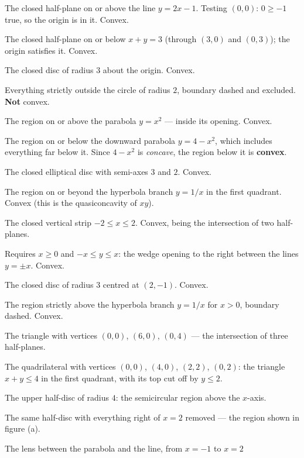 \begin{solutions}
  \item The closed half-plane on or above the line $y=2x-1$. Testing
        $(0,0)$: $0\ge-1$ true, so the origin is in it. Convex.
  \item The closed half-plane on or below $x+y=3$ (through $(3,0)$ and
        $(0,3)$); the origin satisfies it. Convex.
  \item The closed disc of radius $3$ about the origin. Convex.
  \item Everything strictly outside the circle of radius $2$, boundary
        dashed and excluded. \textbf{Not} convex.
  \item The region on or above the parabola $y=x^{2}$ --- inside its
        opening. Convex.
  \item The region on or below the downward parabola $y=4-x^{2}$, which
        includes everything far below it. Since $4-x^{2}$ is
        \emph{concave}, the region below it is \textbf{convex}.
  \item The closed elliptical disc with semi-axes $3$ and $2$. Convex.
  \item The region on or beyond the hyperbola branch $y=1/x$ in the first
        quadrant. Convex (this is the quasiconcavity of $xy$).
  \item The closed vertical strip $-2\le x\le2$. Convex, being the
        intersection of two half-planes.
  \item Requires $x\ge0$ and $-x\le y\le x$: the wedge opening to the right
        between the lines $y=\pm x$. Convex.
  \item The closed disc of radius $3$ centred at $(2,-1)$. Convex.
  \item The region strictly above the hyperbola branch $y=1/x$ for $x>0$,
        boundary dashed. Convex.
  \item The triangle with vertices $(0,0)$, $(6,0)$, $(0,4)$ --- the
        intersection of three half-planes.
  \item The quadrilateral with vertices $(0,0)$, $(4,0)$, $(2,2)$,
        $(0,2)$: the triangle $x+y\le4$ in the first quadrant, with its top
        cut off by $y\le2$.
  \item The upper half-disc of radius $4$: the semicircular region above
        the $x$-axis.
  \item The same half-disc with everything right of $x=2$ removed --- the
        region shown in figure (a).
  \item The lens between the parabola and the line, from $x=-1$ to $x=2$

\end{solutions}
